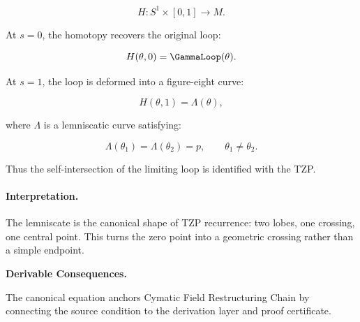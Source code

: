 \begin{equation}
H:S^1\times[0,1]\to M .
\end{equation}

At $s=0$, the homotopy recovers the original loop:

\begin{equation}
H(\theta,0)=\GammaLoop(\theta).
\end{equation}

At $s=1$, the loop is deformed into a figure-eight curve:

\begin{equation}
H(\theta,1)=\Lambda(\theta),
\end{equation}

where $\Lambda$ is a lemniscatic curve satisfying:

\begin{equation}
\Lambda(\theta_1)=\Lambda(\theta_2)=p,
\qquad
\theta_1\neq\theta_2 .
\end{equation}

Thus the self-intersection of the limiting loop is identified with the TZP.

\paragraph{Interpretation.}
The lemniscate is the canonical shape of TZP recurrence: two lobes, one crossing, one central point. This turns the zero point into a geometric crossing rather than a simple endpoint.

\par\vspace{0.35em}
\noindent\textbf{Derivable Consequences.}\quad
\begingroup
\footnotesize
\raggedright
The canonical equation anchors Cymatic Field Restructuring Chain by connecting the source condition to the derivation layer and proof certificate.
\par\endgroup

